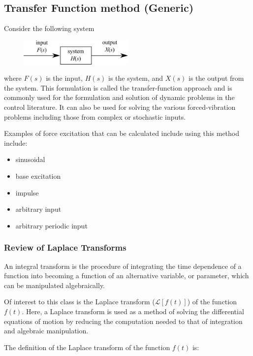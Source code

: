\documentclass[12pt,letter]{article}
\numberwithin{ex}{section} %
\newcommand{\Laplace}[1]{\ensuremath{\mathcal{L}{\left[#1\right]}}}
\begin{document}
		\subsection{Transfer Function method (Generic)}

Consider the following system
\begin{figure}[H]
	\centering
	\includegraphics[width=0.5\textwidth]{../Figures/system_input_output.png}
\end{figure}
where $F(s)$ is the input, $H(s)$ is the system, and $X(s)$ is the output from the system. This formulation is called the transfer-function approach and is commonly used for the formulation and solution of dynamic problems in the control literature. It can also be used for solving the various forced-vibration problems including those from complex or stochastic inputs. 

Examples of force excitation that can be calculated include using this method include:
\begin{itemize}
	\item sinusoidal
	\item base excitation
	\item impulse
	\item arbitrary input
	\item arbitrary periodic input
\end{itemize}

		\subsubsection{Review of Laplace Transforms}
		
		 An integral transform is the procedure of integrating the time dependence of a function into becoming a function of an alternative variable, or parameter, which can be manipulated algebraically. 
		
		Of interest to this class is the Laplace transform ($\Laplace{f(t)}$) of the function $f(t)$. Here, a Laplace transform is used as a method of solving the differential equations of motion by reducing the computation needed to that of integration and algebraic manipulation. 
		
		The definition of the Laplace transform of the function $f(t)$ is:
		
\end{document}
